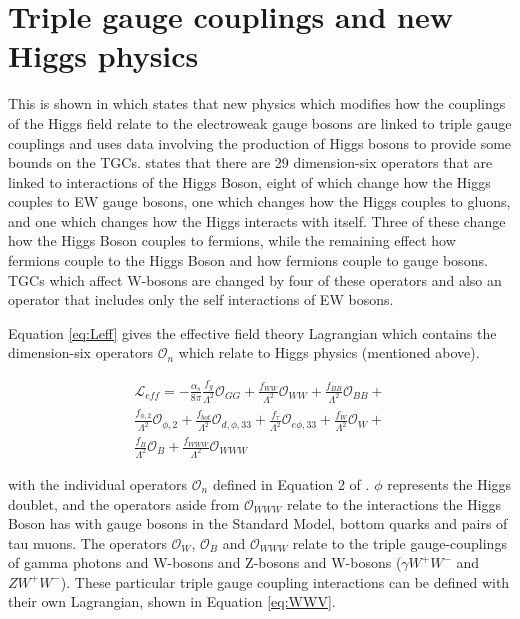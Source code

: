 \documentclass[11pt,oneside,a4paper]{article}
\begin{document}
\section{Triple gauge couplings and new Higgs physics}
This is shown in \cite{higgsdata} which states that new physics which modifies how the couplings of the Higgs field relate to the electroweak gauge bosons are linked to triple gauge couplings and uses data involving the production of Higgs bosons to provide some bounds on the TGCs. \cite{higgsdata} states that there are 29 dimension-six operators that are linked to interactions of the Higgs Boson, eight of which change how the Higgs couples to EW gauge bosons, one which changes how the Higgs couples to gluons, and one which changes how the Higgs interacts with itself. Three of these change how the Higgs Boson couples to fermions, while the remaining effect how fermions couple to the Higgs Boson and how fermions couple to gauge bosons. TGCs which affect W-bosons are changed by four of these operators and also an operator that includes only the self interactions of EW bosons. 

Equation \ref{eq:Leff} gives the effective field theory Lagrangian which contains the dimension-six operators $\mathcal{O}_{n}$ which relate to Higgs physics (mentioned above).



\begin{multline}
\mathcal{L}_{eff} = -\frac{\alpha_{s}}{8\pi}\frac{f_{g}}{\Lambda^{2}}\mathcal{O}_{GG}+ \label{eq:Leff}
\frac{f_{WW}}{\Lambda^{2}}\mathcal{O}_{WW} + \frac{f_{BB}}{\Lambda^{2}}\mathcal{O}_{BB} +\\
\frac{f_{\phi,2}}{\Lambda^{2}}\mathcal{O}_{\phi,2} + \frac{f_{bot}}{\Lambda^{2}}\mathcal{O}_{d,\phi,33} +
\frac{f_{\tau}}{\Lambda^{2}}\mathcal{O}_{e\phi,33} + \frac{f_{W}}{\Lambda^{2}}\mathcal{O}_{W} +\\
\frac{f_{B}}{\Lambda^{2}}\mathcal{O}_{B} + \frac{f_{WWW}}{\Lambda^{2}}\mathcal{O}_{WWW}
\end{multline}

with the individual operators $\mathcal{O}_{n}$ defined in Equation 2 of \cite{higgsdata}. $\phi$ represents the Higgs doublet, and the operators aside from $\mathcal{O}_{WWW}$ relate to the interactions the Higgs Boson has with gauge bosons in the Standard Model, bottom quarks and pairs of tau muons. The operators $\mathcal{O}_{W}$, $\mathcal{O}_{B}$ and $\mathcal{O}_{WWW}$ relate to the triple gauge-couplings of gamma photons and W-bosons and Z-bosons and W-bosons ($\gamma W^{+} W^{-}$ and $Z W^{+} W^{-}$). These particular triple gauge coupling interactions can be defined with their own Lagrangian, shown in Equation \ref{eq:WWV}. 
\end{document}
